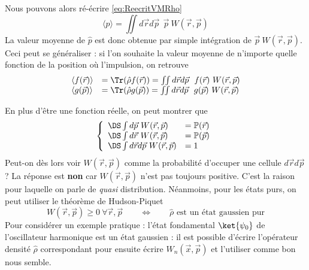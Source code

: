 \begin{itemize}
\begin{equation}
\end{equation}
Nous pouvons alors ré-écrire \eqref{eq:ReecritVMRho}
\begin{equation}
\langle p \rangle = \iint d\vec{r}d\vec{p}\ \ \vec{p}\ W(\vec{r},\vec{p})
\end{equation}
La valeur moyenne de $\hat{p}$ est donc obtenue par simple intégration de $\vec{p}\ W(\vec{r},\vec{p})$. Ceci 
peut se généraliser : si l'on souhaite la valeur moyenne de n'importe quelle fonction de la position où 
l'impulsion, on retrouve
\begin{equation}
\begin{array}{ll}
\langle f(\vec{r})\rangle &= \Tr(\hat{\rho}f(\vec{r})) = \iint d\vec{r}d\vec{p}\ \ f(\vec{r})\ W(\vec{r},\vec{p})\\
\langle g(\vec{p})\rangle &= \Tr(\hat{\rho}g(\vec{p})) = \iint d\vec{r}d\vec{p}\ \ g(\vec{p})\ W(\vec{r},\vec{p})
\end{array}
\end{equation}
\end{itemize}
En plus d'être une fonction réelle, on peut montrer que
\begin{equation}
\left\{\begin{array}{ll}
\DS\int d\vec{p}\ W(\vec{r},\vec{p}) &= \mathbb{P}(\vec{r})\\
\DS\int d\vec{r}\ W(\vec{r},\vec{p}) &= \mathbb{P}(\vec{p})\\
\DS\int d\vec{r}d\vec{p}\ W(\vec{r},\vec{p}) &= 1
\end{array}\right.
\end{equation}
Peut-on dès lors voir $W(\vec{r},\vec{p})$ comme la probabilité d'occuper une cellule $d\vec{r}d\vec{p}$ ? 
La réponse est \textbf{non} car $W(\vec{r},\vec{p})$ n'est pas toujours positive. C'est la raison pour 
laquelle on parle de \textit{quasi} distribution. Néanmoins, pour les états purs, on peut utiliser le 
théorème de Hudson-Piquet
\begin{equation}
W(\vec{r},\vec{p}) \geq 0\ \forall \vec{r},\vec{p}\qquad\Leftrightarrow\qquad \hat{\rho} \text{ est un 
état gaussien pur}
\end{equation}
Pour considérer un exemple pratique : l'état fondamental $\ket{\psi_0}$ de l'oscillateur harmonique est 
un état gaussien : il est possible d'écrire l'opérateur densité $\hat{\rho}$ correspondant pour ensuite 
écrire $W_n(\vec{x},\vec{p})$ et l'utiliser comme bon nous semble.
